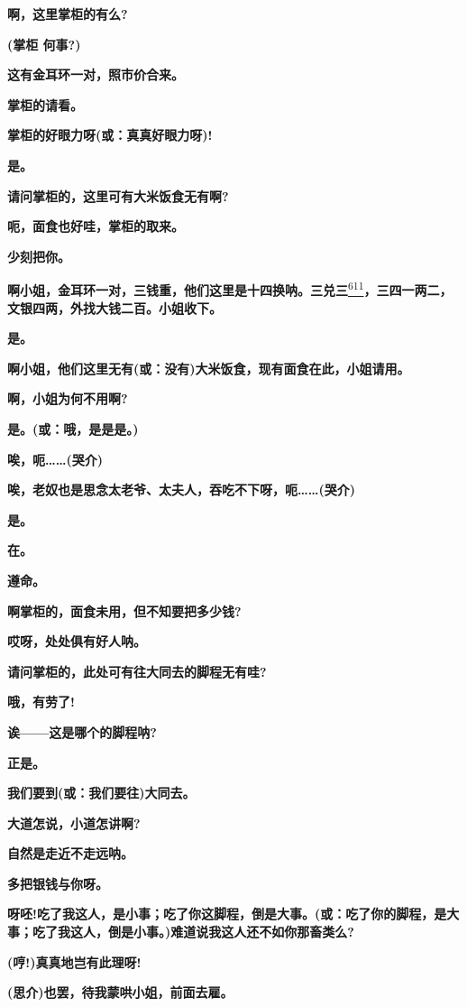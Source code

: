 \textbf{啊，这里掌柜的有么?}

\textbf{(掌柜 何事?)}

\textbf{这有金耳环一对，照市价合来。}

\textbf{掌柜的请看。}

\textbf{掌柜的好眼力呀(或：真真好眼力呀)!}

\textbf{是。}

\textbf{请问掌柜的，这里可有大米饭食无有啊?}

\textbf{呃，面食也好哇，掌柜的取来。}

\textbf{少刻把你。}

\textbf{啊小姐，金耳环一对，三钱重，他们这里是十四换呐。三兑三}\protect\hyperlink{fn611}{\textsuperscript{611}}\textbf{，三四一两二，文银四两，外找大钱二百。小姐收下。}

\textbf{是。}

\textbf{啊小姐，他们这里无有(或：没有)大米饭食，现有面食在此，小姐请用。}

\textbf{啊，小姐为何不用啊?}

\textbf{是。(或：哦，是是是。)}

\textbf{唉，呃\ldots{}\ldots{}(哭介)}

\textbf{唉，老奴也是思念太老爷、太夫人，吞吃不下呀，呃\ldots{}\ldots{}(哭介)}

\textbf{是。}

\textbf{在。}

\textbf{遵命。}

\textbf{啊掌柜的，面食未用，但不知要把多少钱?}

\textbf{哎呀，处处俱有好人呐。}

\textbf{请问掌柜的，此处可有往大同去的脚程无有哇?}

\textbf{哦，有劳了!}

\textbf{诶------这是哪个的脚程呐?}

\textbf{正是。}

\textbf{我们要到(或：我们要往)大同去。}

\textbf{大道怎说，小道怎讲啊?}

\textbf{自然是走近不走远呐。}

\textbf{多把银钱与你呀。}

\textbf{呀呸!吃了我这人，是小事；吃了你这脚程，倒是大事。(或：吃了你的脚程，是大事；吃了我这人，倒是小事。)难道说我这人还不如你那畜类么?}

\textbf{(哼!)真真地岂有此理呀!}

\textbf{(思介)也罢，待我蒙哄小姐，前面去雇。}

